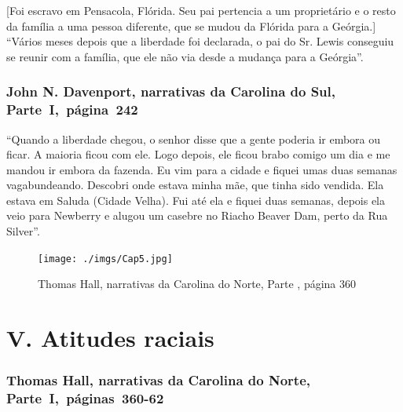 {[}Foi escravo em Pensacola, Flórida. Seu pai pertencia a um proprietário e o resto da família a uma pessoa diferente, que se mudou da Flórida para a Geórgia.{]} ``Vários meses
depois que a liberdade foi declarada, o pai do Sr. Lewis conseguiu se
reunir com a família, que ele não via desde a mudança para a Geórgia''.

\subsection{John N. Davenport, narrativas da Carolina do Sul, Parte~I,~página~242} \label{ref66}

``Quando a liberdade chegou, o senhor disse que a gente poderia ir
embora ou ficar. A maioria ficou com ele. Logo depois, ele ficou brabo
comigo um dia e me mandou ir embora da fazenda. Eu vim para a cidade e
fiquei umas duas semanas vagabundeando. Descobri onde estava minha mãe,
que tinha sido vendida. Ela estava em Saluda (Cidade Velha). Fui até ela
e fiquei duas semanas, depois ela veio para Newberry e alugou um casebre
no Riacho Beaver Dam, perto da Rua Silver''.


\pagebreak
\thispagestyle{empty}
\movetoevenpage
\thispagestyle{empty}

\begin{absolutelynopagebreak}
\begin{vplace}
\begin{figure}[H]
\begin{adjustwidth}{-1.8cm}{}
  \vspace*{-2cm}
  \texttt{[image: ./imgs/Cap5.jpg]}  
\end{adjustwidth}
  \caption{Thomas Hall, narrativas da Carolina do Norte, Parte , página 360}
\end{figure}
\end{vplace}

\end{absolutelynopagebreak}

\chapter{V. Atitudes raciais}

\subsection{Thomas Hall, narrativas da Carolina do Norte, Parte~I,~páginas~360-62}
\label{ref118}

